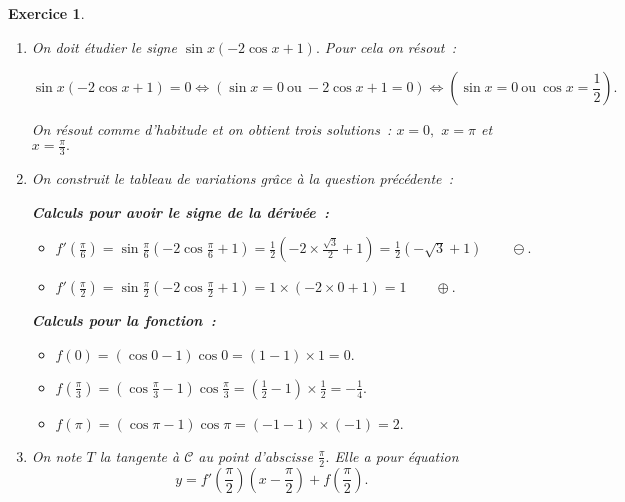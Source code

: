 \documentclass[10pt]{article}
\newtheorem{exo}{Exercice}
\begin{document}
\begin{exo}
\begin{enumerate}
\item On doit étudier le signe $\sin x(-2\cos x+1).$ Pour cela on résout~:

\[\sin x(-2\cos x+1)=0\iff (\sin x=0~\text{ou}~-2\cos x+1=0)\iff \left(\sin x=0~\text{ou}~\cos x=\frac{1}{2}\right).\]


On résout comme d'habitude et on obtient trois solutions~: $x=0,$ $x=\pi$ et $x=\frac{\pi}{3}.$
\item On construit le tableau de variations grâce à la question précédente~:

\medskip

\begin{multicols}{2}
\begin{center}
\end{center}


\textbf{Calculs pour avoir le signe de la dérivée~:}

\begin{itemize}
\item[\textbullet] $f'\left(\frac{\pi}{6}\right)=\sin\frac{\pi}{6}\left(-2\cos\frac{\pi}{6}+1\right)=\frac{1}{2}\left(-2\times\frac{ \sqrt{3}}{2}+1\right)=\frac{1}{2}\left(-\sqrt{3}+1\right)\qquad\ominus.$
\item[\textbullet] $f'\left(\frac{\pi}{2}\right)=\sin\frac{\pi}{2}\left(-2\cos\frac{\pi}{2}+1\right)=1\times \left(-2\times 0+1\right)=1\qquad\oplus.$

\end{itemize}

\medskip

\textbf{Calculs pour la fonction~:}

\begin{itemize}
\item[\textbullet] $f(0)=(\cos 0-1)\cos 0=(1-1)\times 1=0.$
\item[\textbullet] $f\left(\frac{\pi}{3}\right)=\left(\cos \frac{\pi}{3}-1\right)\cos \frac{\pi}{3}=\left(\frac{1}{2}-1\right)\times \frac{1}{2}=-\frac{1}{4}.$
\item[\textbullet] $f(\pi)=(\cos \pi-1)\cos \pi=(-1-1)\times (-1)=2.$
\end{itemize}
\end{multicols}

\item On note $T$ la tangente à $\mathcal{C}$ au point d'abscisse $\frac{\pi}{2}.$ Elle a pour équation 
\[y=f'\left(\frac{\pi}{2}\right)\left(x-\frac{\pi}{2}\right)+f\left(\frac{\pi}{2}\right).\]


\end{enumerate}
\end{exo}
\end{document}
